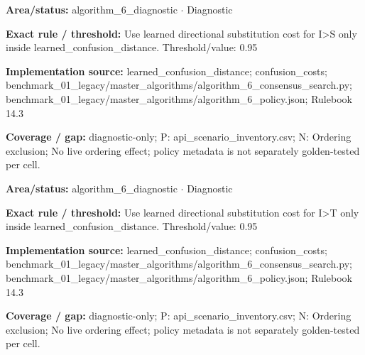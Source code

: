 \begin{tcolorbox}[enhanced,breakable,colback=white,colframe=Muted!45,boxrule=0.45pt,arc=1.5pt,left=6pt,right=6pt,top=5pt,bottom=5pt,title={\texttt{A6-LEARNED-SUBSTITUTION-I-S}},title after break={\texttt{A6-LEARNED-SUBSTITUTION-I-S}\ (continued)},fonttitle=\headingfont\bfseries\color{Navy},coltitle=Navy]
\textbf{Area/status:} algorithm\_\allowbreak{}6\_\allowbreak{}diagnostic $\boldsymbol{\cdot}$ Diagnostic\par
\smallskip
\textbf{Exact rule / threshold:} Use learned directional substitution cost for I>S only inside learned\_\allowbreak{}confusion\_\allowbreak{}distance. Threshold/\allowbreak{}value: 0.95\par
\smallskip
\textbf{Implementation source:} learned\_\allowbreak{}confusion\_\allowbreak{}distance; confusion\_\allowbreak{}costs; benchmark\_\allowbreak{}01\_\allowbreak{}legacy/\allowbreak{}master\_\allowbreak{}algorithms/\allowbreak{}algorithm\_\allowbreak{}6\_\allowbreak{}consensus\_\allowbreak{}search.py; benchmark\_\allowbreak{}01\_\allowbreak{}legacy/\allowbreak{}master\_\allowbreak{}algorithms/\allowbreak{}algorithm\_\allowbreak{}6\_\allowbreak{}policy.json; Rulebook 14.3\par
\smallskip
\textbf{Coverage / gap:} diagnostic-only; P: api\_\allowbreak{}scenario\_\allowbreak{}inventory.csv; N: Ordering exclusion; No live ordering effect; policy metadata is not separately golden-tested per cell.
\end{tcolorbox}
\begin{tcolorbox}[enhanced,breakable,colback=white,colframe=Muted!45,boxrule=0.45pt,arc=1.5pt,left=6pt,right=6pt,top=5pt,bottom=5pt,title={\texttt{A6-LEARNED-SUBSTITUTION-I-T}},title after break={\texttt{A6-LEARNED-SUBSTITUTION-I-T}\ (continued)},fonttitle=\headingfont\bfseries\color{Navy},coltitle=Navy]
\textbf{Area/status:} algorithm\_\allowbreak{}6\_\allowbreak{}diagnostic $\boldsymbol{\cdot}$ Diagnostic\par
\smallskip
\textbf{Exact rule / threshold:} Use learned directional substitution cost for I>T only inside learned\_\allowbreak{}confusion\_\allowbreak{}distance. Threshold/\allowbreak{}value: 0.95\par
\smallskip
\textbf{Implementation source:} learned\_\allowbreak{}confusion\_\allowbreak{}distance; confusion\_\allowbreak{}costs; benchmark\_\allowbreak{}01\_\allowbreak{}legacy/\allowbreak{}master\_\allowbreak{}algorithms/\allowbreak{}algorithm\_\allowbreak{}6\_\allowbreak{}consensus\_\allowbreak{}search.py; benchmark\_\allowbreak{}01\_\allowbreak{}legacy/\allowbreak{}master\_\allowbreak{}algorithms/\allowbreak{}algorithm\_\allowbreak{}6\_\allowbreak{}policy.json; Rulebook 14.3\par
\smallskip
\textbf{Coverage / gap:} diagnostic-only; P: api\_\allowbreak{}scenario\_\allowbreak{}inventory.csv; N: Ordering exclusion; No live ordering effect; policy metadata is not separately golden-tested per cell.
\end{tcolorbox}
